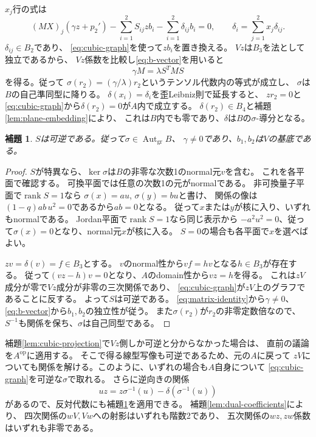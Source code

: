 \documentclass[11pt,a4paper]{ltjsarticle}
\newtheorem{lemma}[theorem]{補題}
\theoremstyle{definition}
\newcommand{\Aut}{\operatorname{Aut}}
\newcommand{\rk}{\operatorname{rank}}
\begin{document}
$x_j$行の式は
\[
(MX)_j(\gamma z+p_2')
-\sum_{i=1}^2 S_{ij}zb_i
-\sum_{i=1}^2\delta_{ij}b_i=0,
\qquad
\delta_i=\sum_{j=1}^2x_j\delta_{ij}.
\]
$\delta_{ij}\in B_2$であり、
\eqref{eq:cubic-graph}を使って$zb_i$を置き換える。
$Vz$は$B_3$を法として独立であるから、
$Vz$係数を比較し\eqref{eq:b-vector}を用いると
\begin{equation}\label{eq:matrix-identity}
\gamma M=\lambda S^TMS
\end{equation}
を得る。従って
$\sigma(r_2)=(\gamma/\lambda)r_2$というテンソル代数内の等式が成立し、
$\sigma$は$B$の自己準同型に降りる。
$\delta(x_i)=\delta_i$を歪Leibniz則で延長すると、
$zr_2=0$と\eqref{eq:cubic-graph}から$\delta(r_2)=0$が$A$内で成立する。
$\delta(r_2)\in B_4$と補題\ref{lem:plane-embedding}により、
これは$B$内でも零であり、$\delta$は$B$の$\sigma$-導分となる。

\begin{lemma}\label{lem:first-automorphism}
$S$は可逆である。従って$\sigma\in\Aut_{\mathrm{gr}}B$、
$\gamma\ne0$であり、$b_1,b_2$は$V$の基底である。
\end{lemma}
\begin{proof}
$S$が特異なら、$\ker\sigma$は$B$の非零な次数1のnormal元$v$を含む。
これを各平面で確認する。
可換平面では任意の次数1の元がnormalである。
非可換量子平面で$\rk S=1$なら
$\sigma(x)=a u$, $\sigma(y)=b u$と書け、
関係の像は$(1-q)ab\,u^2=0$であるから$ab=0$となる。
従って$x$または$y$が核に入り、いずれもnormalである。
Jordan平面で$\rk S=1$なら同じ表示から
$-a^2u^2=0$、従って$\sigma(x)=0$となり、normal元$x$が核に入る。
$S=0$の場合も各平面で$x$を選べばよい。

$zv=\delta(v)=f\in B_3$とする。
$v$のnormal性から$vf=hv$となる$h\in B_3$が存在する。
従って$(vz-h)v=0$となり、$A$のdomain性から$vz=h$を得る。
これは$zV$成分が零で$Vz$成分が非零の三次関係であり、
\eqref{eq:cubic-graph}が$zV$上のグラフであることに反する。
よって$S$は可逆である。
\eqref{eq:matrix-identity}から$\gamma\ne0$、
\eqref{eq:b-vector}から$b_1,b_2$の独立性が従う。
また$\sigma(r_2)$が$r_2$の非零定数倍なので、
$S^{-1}$も関係を保ち、$\sigma$は自己同型である。
\end{proof}

補題\ref{lem:cubic-projection}で$Vz$側しか可逆と分からなかった場合は、
直前の議論を$A^{\mathrm{op}}$に適用する。
そこで得る線型写像も可逆であるため、元の$A$に戻って
$zV$についても関係を解ける。このように、いずれの場合も$A$自身について
\eqref{eq:cubic-graph}を可逆な$\sigma$で取れる。
さらに逆向きの関係
\[
uz=z\sigma^{-1}(u)-\delta(\sigma^{-1}(u))
\]
があるので、反対代数にも補題\ref{lem:first-automorphism}を適用できる。
補題\ref{lem:dual-coefficients}により、
四次関係の$wV,Vw$への射影はいずれも階数2であり、
五次関係の$wz,zw$係数はいずれも非零である。
\end{document}
